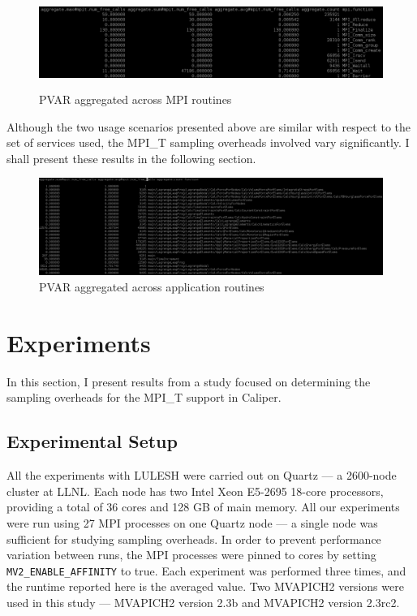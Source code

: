 \begin{center}
	\begin{figure}[tbp!]
         \centering
  \captionsetup{justification=centering}
		\includegraphics[scale=0.8, width=\columnwidth, height=3cm]{figures/CALIPER_MPI_counter_PVAR}
		\caption{PVAR aggregated across MPI routines}
		\label{fig:cali-counter}
	\end{figure}
\end{center}
\par Although the two usage scenarios presented above are similar with respect to the set of services used, the MPI\_T sampling overheads involved vary significantly. I shall present these results in the following section.
\begin{center}
	\begin{figure}[bp!]
         \centering
  \captionsetup{justification=centering}
		\includegraphics[scale=0.8, width=\columnwidth, keepaspectratio]{figures/CALIPER_app_counter_PVAR}
		\caption{PVAR aggregated across application routines}
		\label{fig:cali-app-counter}
	\end{figure}
\end{center}

\section{Experiments}
In this section, I present results from a study focused on determining the sampling overheads for the MPI\_T support in Caliper.
\subsection{Experimental Setup}
All the experiments with LULESH were carried out on Quartz --- a 2600-node cluster at LLNL. Each node has two Intel Xeon E5-2695 18-core processors, providing a total of 36 cores and 128 GB of main memory. All our experiments were run using 27 MPI processes on one Quartz node --- a single node was sufficient for studying sampling overheads. In order to prevent performance variation between runs, the MPI processes were pinned to cores by setting \verb+MV2_ENABLE_AFFINITY+ to true. Each experiment was performed three times, and the runtime reported here is the averaged value. Two MVAPICH2 versions were used in this study --- MVAPICH2 version 2.3b and MVAPICH2 version 2.3rc2. 
